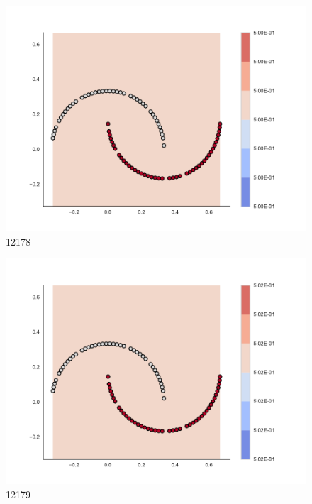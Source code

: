 \begin{subfigure}[b]{0.09\textwidth}
    \includegraphics[clip, trim=2.35cm 1.75cm 4.5cm 0cm,width=\textwidth]{img/convergence/12178.pdf}
    \caption{12178}
    \label{fig:convergence_12178}
\end{subfigure}
%
\begin{subfigure}[b]{0.09\textwidth}
    \includegraphics[clip, trim=2.35cm 1.75cm 4.5cm 0cm,width=\textwidth]{img/convergence/12179.pdf}
    \caption{12179}
    \label{fig:convergence_12179}
\end{subfigure}
%
